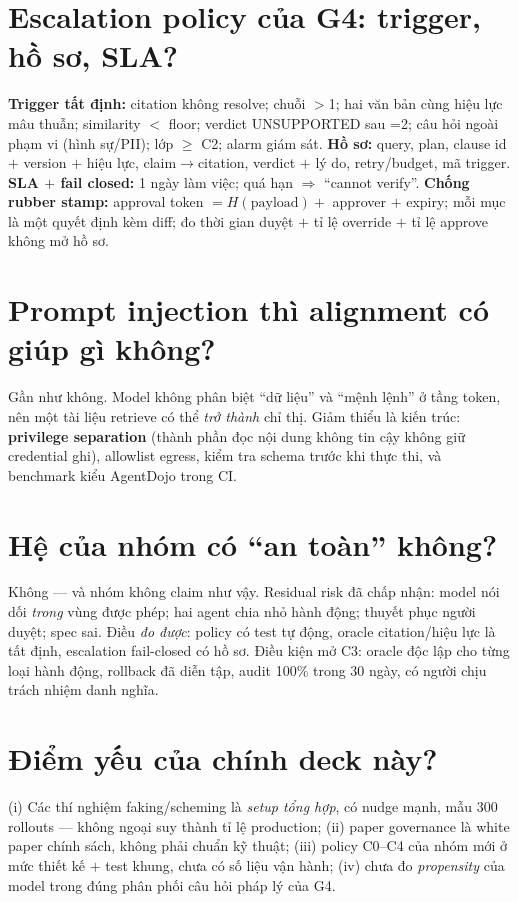 \documentclass[10pt,a4paper]{article}
\newcommand{\code}[1]{\texttt{\detokenize{#1}}}
\begin{document}
\section{Escalation policy của G4: trigger, hồ sơ, SLA?}
\textbf{Trigger tất định:} citation không resolve; chuỗi \code{superseded_by} $>$1; hai văn bản cùng hiệu lực mâu thuẫn;
similarity $<$ floor; verdict UNSUPPORTED sau \code{max_retries}=2; câu hỏi ngoài phạm vi (hình sự/PII); lớp $\ge$ C2;
alarm giám sát. \textbf{Hồ sơ:} query, plan, clause id $+$ version $+$ hiệu lực, claim$\to$citation, verdict $+$ lý do,
retry/budget, mã trigger. \textbf{SLA $+$ fail closed:} 1 ngày làm việc; quá hạn $\Rightarrow$ ``cannot verify''.
\textbf{Chống rubber stamp:} approval token $= H(\text{payload}) + $ approver $+$ expiry; mỗi mục là một quyết định kèm diff;
đo thời gian duyệt $+$ tỉ lệ override $+$ tỉ lệ approve không mở hồ sơ.

\section{Prompt injection thì alignment có giúp gì không?}
Gần như không. Model không phân biệt ``dữ liệu'' và ``mệnh lệnh'' ở tầng token, nên một tài liệu retrieve có thể
\emph{trở thành} chỉ thị. Giảm thiểu là kiến trúc: \textbf{privilege separation} (thành phần đọc nội dung không tin cậy
không giữ credential ghi), allowlist egress, kiểm tra schema trước khi thực thi, và benchmark kiểu AgentDojo trong CI.

\section{Hệ của nhóm có ``an toàn'' không?}
Không --- và nhóm không claim như vậy. Residual risk đã chấp nhận: model nói dối \emph{trong} vùng được phép;
hai agent chia nhỏ hành động; thuyết phục người duyệt; spec sai. Điều \emph{đo được}: policy có test tự động,
oracle citation/hiệu lực là tất định, escalation fail-closed có hồ sơ. Điều kiện mở C3: oracle độc lập cho từng
loại hành động, rollback đã diễn tập, audit 100\% trong 30 ngày, có người chịu trách nhiệm danh nghĩa.

\section{Điểm yếu của chính deck này?}
(i) Các thí nghiệm faking/scheming là \emph{setup tổng hợp}, có nudge mạnh, mẫu 300 rollouts --- không ngoại suy
thành tỉ lệ production; (ii) paper governance là white paper chính sách, không phải chuẩn kỹ thuật;
(iii) policy C0--C4 của nhóm mới ở mức thiết kế $+$ test khung, chưa có số liệu vận hành;
(iv) chưa đo \emph{propensity} của model trong đúng phân phối câu hỏi pháp lý của G4.
\end{document}
